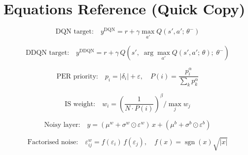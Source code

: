 \documentclass[12pt]{article}
\begin{document}
\section{Equations Reference (Quick Copy)}

\[
  \text{DQN target:} \quad
  y^{\text{DQN}} = r + \gamma \max_{a'} Q(s', a';\,\theta^-)
\]

\[
  \text{DDQN target:} \quad
  y^{\text{DDQN}} = r + \gamma\, Q\!\left(s',\; \arg\max_{a'} Q(s',a';\,\theta);\; \theta^-\right)
\]

\[
  \text{PER priority:} \quad p_i = |\delta_i| + \varepsilon, \quad
  P(i) = \frac{p_i^\alpha}{\sum_k p_k^\alpha}
\]

\[
  \text{IS weight:} \quad w_i = \left(\frac{1}{N \cdot P(i)}\right)^{\!\beta} \Big/ \max_j w_j
\]

\[
  \text{Noisy layer:} \quad
  y = (\mu^w + \sigma^w \odot \varepsilon^w)\,x + (\mu^b + \sigma^b \odot \varepsilon^b)
\]

\[
  \text{Factorised noise:} \quad
  \varepsilon^w_{ij} = f(\varepsilon_i)\,f(\varepsilon_j), \quad f(x) = \operatorname{sgn}(x)\sqrt{|x|}
\]
\end{document}
